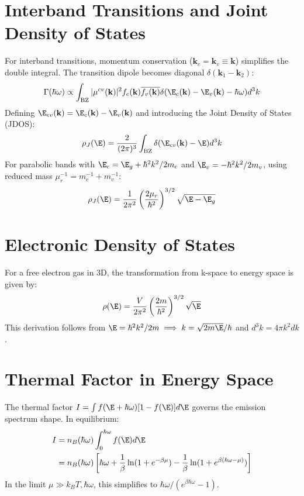 \section{Interband Transitions and Joint Density of States}
\label{app:interband_jdos}

For interband transitions, momentum conservation ($\mathbf{k}_{c} = \mathbf{k}_{v} \equiv \mathbf{k}$) simplifies the double integral. The transition dipole becomes diagonal $\delta(\mathbf{k}_{1}-\mathbf{k}_{2})$:
\begin{equation}
    \Gamma(\hbar\omega) \propto \int_{\text{BZ}} |\mu^{cv}(\mathbf{k})|^{2} f_{c}(\mathbf{k})\overline{f_{v}(\mathbf{k})} \delta(\E_{c}(\mathbf{k}) - \E_{v}(\mathbf{k}) - \hbar\omega) d^{3}k
\end{equation}
Defining $\E_{cv}(\mathbf{k}) = \E_{c}(\mathbf{k}) - \E_{v}(\mathbf{k})$ and introducing the Joint Density of States (JDOS):
\begin{equation}
    \rho_{J}(\E) = \frac{2}{(2\pi)^{3}} \int_{\text{BZ}} \delta(\E_{cv}(\mathbf{k}) - \E) d^{3}k
\end{equation}
For parabolic bands with $\E_{c} = \E_{g} + \hbar^{2}k^{2}/2m_{c}$ and $\E_{v} = -\hbar^{2}k^{2}/2m_{v}$, using reduced mass $\mu_{r}^{-1} = m_{c}^{-1} + m_{v}^{-1}$:
\begin{equation}
    \rho_{J}(\E) = \frac{1}{2\pi^2} \left( \frac{2\mu_r}{\hbar^2} \right)^{3/2} \sqrt{\E - \E_g}
\end{equation}

\section{Electronic Density of States}
\label{app:edos}
For a free electron gas in 3D, the transformation from k-space to energy space is given by:
\begin{equation}
    \rho(\E) = \frac{V}{2\pi^{2}} \left(\frac{2m}{\hbar^{2}}\right)^{3/2} \sqrt{\E}
\end{equation}
This derivation follows from $\E = \hbar^{2}k^{2}/2m \implies k = \sqrt{2m\E}/\hbar$ and $d^{3}k = 4\pi k^{2} dk$.

\section{Thermal Factor in Energy Space}
\label{app:thermal_factor}
The thermal factor $I = \int f(\E+\hbar\omega)[1-f(\E)] d\E$ governs the emission spectrum shape.
In equilibrium:
\begin{align}
    I &= n_{B}(\hbar\omega) \int_{0}^{\hbar\omega} f(\E) d\E \\
    &= n_{B}(\hbar\omega) \left[ \hbar\omega + \frac{1}{\beta}\ln(1+e^{-\beta\mu}) - \frac{1}{\beta}\ln(1+e^{\beta(\hbar\omega-\mu)}) \right]
\end{align}
In the limit $\mu \gg k_{B}T, \hbar\omega$, this simplifies to $\hbar\omega / (e^{\beta\hbar\omega}-1)$.

